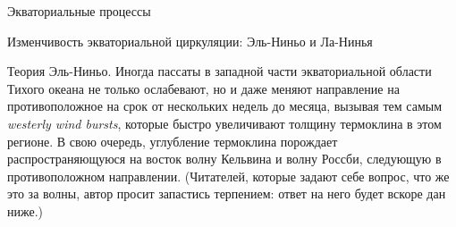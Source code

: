 \begin{chapter}{Экваториальные процессы}
\begin{section}{Изменчивость экваториальной циркуляции: Эль-Ниньо и Ла-Нинья}
\begin{paragraph}{Теория Эль-Ниньо.}
Иногда пассаты в западной части экваториальной области Тихого океана
не только ослабевают, но и даже меняют направление на противоположное 
на срок от нескольких недель до месяца, вызывая тем самым
\emph{westerly wind bursts}, 
которые быстро увеличивают толщину термоклина 
в этом регионе. В свою очередь, углубление термоклина%
порождает распространяющуюся на восток волну Кельвина 
и волну Россби, следующую в противоположном направлении. 
(Читателей, которые задают себе вопрос, что же это за волны, автор просит 
запастись терпением: ответ на него будет вскоре дан ниже.)
%



\end{paragraph}
\end{section}
\end{chapter}
